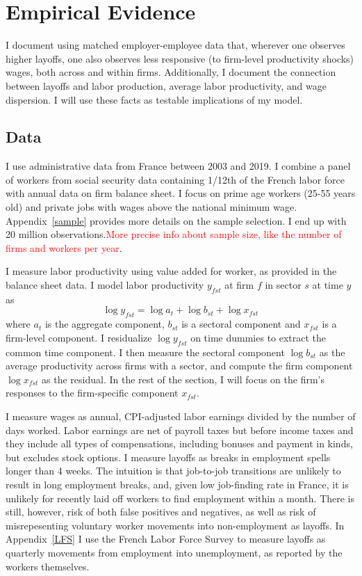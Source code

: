 \section{Empirical Evidence}
I document using matched employer-employee data that, wherever one observes higher layoffs, one also observes less responsive (to firm-level productivity shocks) wages, both across and within firms. Additionally, I document the connection between layoffs and labor production, average labor productivity, and wage dispersion. I will use these facts as testable implications of my model.

\subsection*{Data}
I use administrative data from France between 2003 and 2019. I combine a panel of workers from social security data containing 1/12th of the French labor force with annual data on firm balance sheet.  I focus on prime age workers (25-55 years old) and private jobs with wages above the national minimum wage. Appendix~\ref{sample} provides more details on the sample selection. I end up with 20 million observations.\textcolor{red}{More precise info about sample size, like the number of firms and workers per year}.

I measure labor productivity using value added for worker, as provided in the balance sheet data. I model labor productivity $y_{fst}$ at firm $f$ in sector $s$ at time $y$ as 
\[ \log y_{fst} = \log a_t + \log b_{st}+ \log x_{fst}\]
where $a_t$ is the aggregate component, $b_{st}$ is a sectoral component and $x_{fst}$ is a firm-level component. I residualize $\log y_{fst}$ on time dummies to extract the common time component. I then measure the sectoral component $\log b_{st}$ as the average productivity across firms with a sector, and compute the firm component $\log x_{fst}$ as the residual. In the rest of the section, I will focus on the firm's responses to the firm-specific component $x_{fst}$.

I measure wages as annual, CPI-adjusted labor earnings divided by the number of days worked. Labor earnings are net of payroll taxes but before income
taxes and they include all types of compensations, including bonuses and payment in kinds, but excludes stock options.
I measure layoffs as breaks in employment spells longer than 4 weeks. The intuition is that job-to-job transitions are unlikely to result in long employment breaks, and, given low job-finding rate in France, it is unlikely for recently laid off workers to find employment within a month. There is still, however, risk of both false positives and negatives, as well as risk of misrepesenting voluntary worker movements into non-employment as layoffs. In Appendix~\ref{LFS} I use the French Labor Force Survey to measure layoffs as quarterly movements from employment into unemployment, as reported by the workers themselves.
